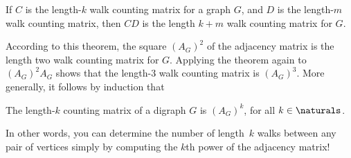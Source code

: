 \begin{theorem}\label{thm:CkDm}
 If $C$ is the length-$k$ walk counting matrix for a graph $G$, and
 $D$ is the length-$m$ walk counting matrix, then $CD$ is the length
 $k+m$ walk counting matrix for $G$.
\end{theorem}

According to this theorem, the square $(A_G)^2$ of the adjacency
matrix is the length two walk counting matrix for $G$.  Applying the
theorem again to $(A_G)^2A_G$ shows that the length-3 walk counting
matrix is $(A_G)^3$.  More generally, it follows by induction that
\begin{corollary}\label{AGklenk}
The length-$k$ counting matrix of a digraph $G$ is $(A_G)^k$, for
all $k \in \naturals$.
\end{corollary}
In other words, you can determine the number of length~$k$ walks
between any pair of vertices simply by computing the $k$th power of
the adjacency matrix!   \iffalse

For example, the first three powers of the adjacency matrix for the
graph in Figure~\ref{fig:5AD} are:
\begin{align*}
    A &= \begin{pmatrix}
            0 & 1 & 1 & 1 \\
            1 & 0 & 1 & 0 \\
            1 & 1 & 0 & 1 \\
            1 & 0 & 1 & 0
         \end{pmatrix} & %
  A^2 &= \begin{pmatrix}
            3 & 1 & 2 & 1 \\
            1 & 2 & 1 & 2 \\
            2 & 1 & 3 & 1 \\
            1 & 2 & 1 & 2
         \end{pmatrix} & %
  A^3 &= \begin{pmatrix}
            4 & 5 & 5 & 5 \\
            5 & 2 & 5 & 2 \\
            5 & 5 & 4 & 5 \\
            5 & 2 & 5 & 2
         \end{pmatrix}
\end{align*}

Sure enough, $(A^3)_{14}$ is $5$, which is the number of length~3 walks
from~$v_1$ to~$v_4$.  And $(A^3)_{24} = 2$, which is the number of
length~3 walks from $v_2$ to~$v_4$.  
\fi

